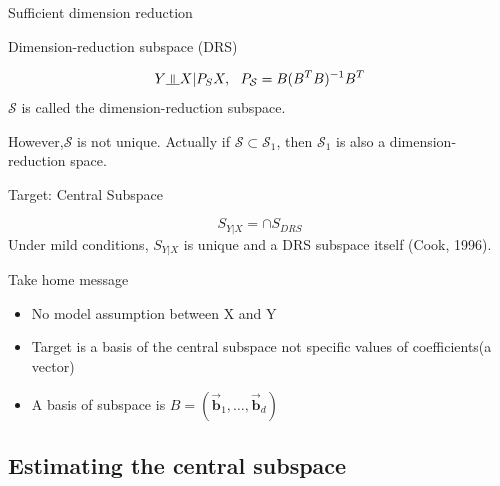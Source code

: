 \documentclass[ignorenonframetext,]{beamer}
\providecommand{\tightlist}{%
  \setlength{\itemsep}{0pt}\setlength{\parskip}{0pt}}
\newcommand{\indep}{\rotatebox[origin=c]{90}{$\models$}}
\begin{document}
\begin{frame}{Sufficient dimension reduction}

\begin{block}{Dimension-reduction subspace (DRS)}

\[
  Y \indep X|P_SX,~~ P_\mathcal{S} = B(B^TB)^{-1}B^T
\] \(\mathcal{S}\) is called the dimension-reduction subspace.

However,\(\mathcal{S}\) is not unique. Actually if
\(\mathcal{S} \subset \mathcal{S}_1\), then \(\mathcal{S}_1\) is also a
dimension-reduction space.

\end{block}

\begin{block}{Target: Central Subspace}

\[
S_{Y|X} = \cap S_{DRS}
\] Under mild conditions, \(S_{Y|X}\) is unique and a DRS subspace
itself (Cook, 1996).

\end{block}

\end{frame}

\begin{frame}{Take home message}

\begin{itemize}
\tightlist
\item
  No model assumption between X and Y\\
\item
  Target is a basis of the central subspace not specific values of
  coefficients(a vector)
\item
  A basis of subspace is
  \(B = (\vec{\mathbf{b}}_1, \dots, \vec{\mathbf{b}}_d)\)
\end{itemize}

\end{frame}

\subsection{Estimating the central
subspace}\label{estimating-the-central-subspace}
\end{document}
